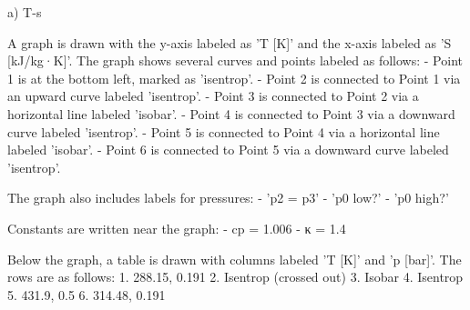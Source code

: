 a) T-s  

A graph is drawn with the y-axis labeled as 'T [K]' and the x-axis labeled as 'S [kJ/kg·K]'. The graph shows several curves and points labeled as follows:  
- Point 1 is at the bottom left, marked as 'isentrop'.  
- Point 2 is connected to Point 1 via an upward curve labeled 'isentrop'.  
- Point 3 is connected to Point 2 via a horizontal line labeled 'isobar'.  
- Point 4 is connected to Point 3 via a downward curve labeled 'isentrop'.  
- Point 5 is connected to Point 4 via a horizontal line labeled 'isobar'.  
- Point 6 is connected to Point 5 via a downward curve labeled 'isentrop'.  

The graph also includes labels for pressures:  
- 'p2 = p3'  
- 'p0 low?'  
- 'p0 high?'  

Constants are written near the graph:  
- cp = 1.006  
- κ = 1.4  

Below the graph, a table is drawn with columns labeled 'T [K]' and 'p [bar]'. The rows are as follows:  
1. 288.15, 0.191  
2. Isentrop (crossed out)  
3. Isobar  
4. Isentrop  
5. 431.9, 0.5  
6. 314.48, 0.191
